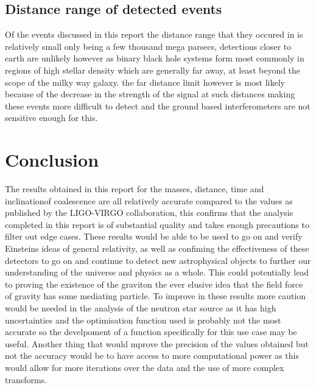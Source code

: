\documentclass{article}
\begin{document}
\subsection*{Distance range of detected events}
Of the events discussed in this report the distance range that they occured in is relatively small only being a few thousand mega parsecs, detections closer to earth are unlikely however
as binary black hole systems form most commonly in regions of high stellar density which are generally far away, at least beyond the scope of the milky way galaxy.
the far distance limit however is most likely because of the decrease in the strength of the signal at such distances making these events more difficult to detect and the ground based interferometers
are not sensitive enough for this.

\section*{Conclusion}
The results obtained in this report for the masses, distance, time and inclinationof coalescence are all relatively accurate compared to the values
as published by the LIGO-VIRGO collaboration, this confirms that the analysis completed in this report is of substantial quality and takes enough precautions to
filter out edge cases. These results would be able to be used to go on and verify Einsteins ideas of general relativity, as well as confiming the effectiveness of these
detectors to go on and continue to detect new astrophysical objects to further our understanding of the universe and physics as a whole. This could potentially lead to
proving the existence of the graviton the ever elusive idea that the field force of gravity has some mediating particle.
To improve in these results more caution would be needed in the analysis of the neutron star source as it has high uncertainties and the optimisation function used is probably not
the most accurate so the develpoment of a function specifically for this use case may be useful. Another thing that would mprove the precision of the values obtained but not the
accuracy would be to have access to more computational power as this would allow for more iterations over the data and the use of more complex transforms.

\vspace{1cm}


%

\end{document}
